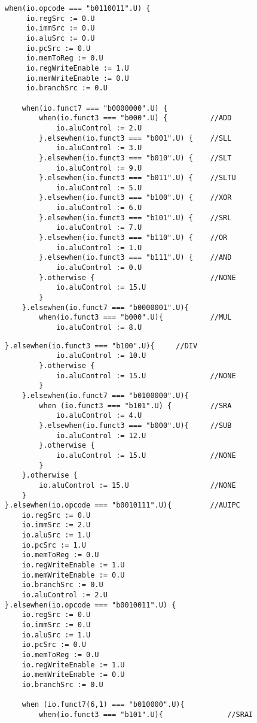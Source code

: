 \documentclass[12pt, letterpaper]{report}
\begin{document}
\begin{lstlisting}[style=scala]
when(io.opcode === "b0110011".U) {
	 io.regSrc := 0.U
	 io.immSrc := 0.U
	 io.aluSrc := 0.U
	 io.pcSrc := 0.U
	 io.memToReg := 0.U
	 io.regWriteEnable := 1.U
	 io.memWriteEnable := 0.U
	 io.branchSrc := 0.U
    
	when(io.funct7 === "b0000000".U) {
    	when(io.funct3 === "b000".U) {          //ADD
    		io.aluControl := 2.U
    	}.elsewhen(io.funct3 === "b001".U) {    //SLL
    		io.aluControl := 3.U
    	}.elsewhen(io.funct3 === "b010".U) {    //SLT
    		io.aluControl := 9.U
    	}.elsewhen(io.funct3 === "b011".U) {    //SLTU
    		io.aluControl := 5.U
    	}.elsewhen(io.funct3 === "b100".U) {    //XOR
    		io.aluControl := 6.U
    	}.elsewhen(io.funct3 === "b101".U) {    //SRL
    		io.aluControl := 7.U
    	}.elsewhen(io.funct3 === "b110".U) {    //OR
    		io.aluControl := 1.U
    	}.elsewhen(io.funct3 === "b111".U) {    //AND
    		io.aluControl := 0.U                
    	}.otherwise {                           //NONE
    		io.aluControl := 15.U
    	}
    }.elsewhen(io.funct7 === "b0000001".U){
    	when(io.funct3 === "b000".U){           //MUL
    		io.aluControl := 8.U
\end{lstlisting}
\noindent\begin{lstlisting}[style=scala]
    	}.elsewhen(io.funct3 === "b100".U){     //DIV
    		io.aluControl := 10.U
    	}.otherwise {
    		io.aluControl := 15.U               //NONE  
    	}
    }.elsewhen(io.funct7 === "b0100000".U){
    	when (io.funct3 === "b101".U) {         //SRA
    		io.aluControl := 4.U
    	}.elsewhen(io.funct3 === "b000".U){     //SUB
    		io.aluControl := 12.U
    	}.otherwise {
    		io.aluControl := 15.U               //NONE
    	}
    }.otherwise {
    	io.aluControl := 15.U                   //NONE
    }
}.elsewhen(io.opcode === "b0010111".U){         //AUIPC
    io.regSrc := 0.U
    io.immSrc := 2.U
    io.aluSrc := 1.U
    io.pcSrc := 1.U
    io.memToReg := 0.U
    io.regWriteEnable := 1.U
    io.memWriteEnable := 0.U
    io.branchSrc := 0.U
    io.aluControl := 2.U
}.elsewhen(io.opcode === "b0010011".U) {
    io.regSrc := 0.U
    io.immSrc := 0.U
    io.aluSrc := 1.U
    io.pcSrc := 0.U
    io.memToReg := 0.U
    io.regWriteEnable := 1.U
    io.memWriteEnable := 0.U
    io.branchSrc := 0.U
    
    when (io.funct7(6,1) === "b010000".U){
    	when(io.funct3 === "b101".U){               //SRAI
\end{lstlisting}
\end{document}
